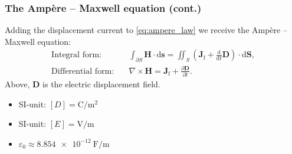 \begin{frame}
	\frametitle{The Amp\`ere -- Maxwell equation (cont.)}
        Adding the displacement current to \eqref{eq:ampere_law} we receive the Amp\`ere -- Maxwell equation:
            \begin{align}    
            \mbox{Integral form:} \quad  &\int_{\partial S} \bm{H} \cdot \mathrm{d}\bm{s} = \iint_{S}\left(\bm{J}_\mathrm{f} + \frac{\mathrm{d}}{\mathrm{d} t} \bm{D} \right)\cdot\mathrm{d}\bm{S}, \\
            \mbox{Differential form:} \quad &\nabla \times \bm{H} = \bm{J}_\mathrm{f} +  \frac{\partial\bm{D}}{\partial t}. 
            \label{eq:ampere_maxwell_law}
        \end{align}
        Above, $\bm{D}$ is the electric displacement field.
        \vspace{0.5cm}
        \begin{itemize}
            \item SI-unit: $[D] = \si{\coulomb\per\metre\squared}$
            \item SI-unit: $[E] = \si{\volt\per\metre}$
            \item $\varepsilon_0 \approx \SI{8.854e-12}{\farad\per\metre}$
        \end{itemize}
\end{frame}

